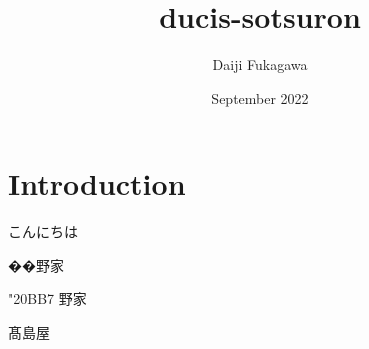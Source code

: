 \documentclass{article}
\title{ducis-sotsuron}
\author{Daiji Fukagawa}
\date{September 2022}
\begin{document}
\maketitle

\section{Introduction}

こんにちは

��野家

\Uchar"20BB7 野家 %

髙島屋
\end{document}
